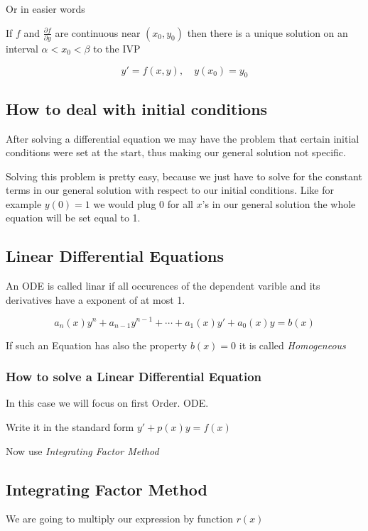 Or in easier words

If \(f\) and \(\frac{\partial f}{\partial y}\) are continuous near \((x_0, y_0)\) then
there is a unique solution on an interval \(\alpha < x_0 < \beta\) to the IVP

\[y' = f(x,y), \quad y(x_0) = y_0\]

\subsection{How to deal with initial conditions}

After solving a differential equation we may have the problem that certain initial
conditions were set at the start, thus making our general solution not specific.

Solving this problem is pretty easy, because we just have to solve for the constant terms
in our general solution with respect to our initial conditions. Like for example \(y(0) = 1\)
we would plug 0 for all \(x\)'s in our general solution the whole equation will be set equal to 1.

\subsection{Linear Differential Equations}

An ODE is called linar if all occurences of the dependent varible and its
derivatives have a exponent of at most 1.

\[a_n(x)y^n + a_{n - 1}y^{n -1} + \cdots + a_1(x)y' + a_0(x)y = b(x)\]

If such an Equation has also the property \(b(x) = 0\) it is called \emph{Homogeneous}

\subsubsection{How to solve a Linear Differential Equation}

In this case we will focus on first Order. ODE.

Write it in the standard form \(y' + p(x)y = f(x)\)

Now use \emph{Integrating Factor Method}

\subsection{Integrating Factor Method}

We are going to multiply our expression by function \(r(x)\) 


